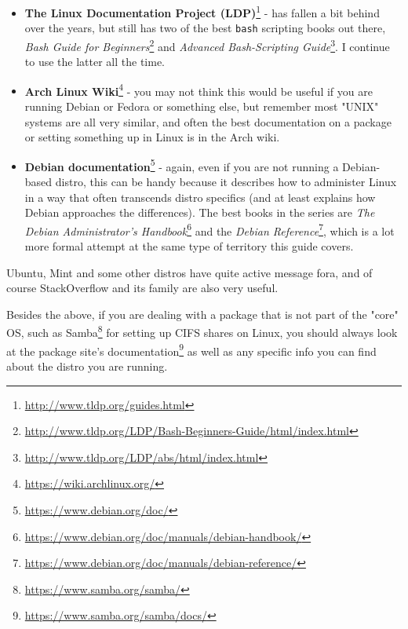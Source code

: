 \documentclass[10pt,]{book}
\renewcommand{\href}[2]{#2\footnote{\url{#1}}}
\numberwithin{figure}{chapter}
\begin{document}
\begin{itemize}
\item
  \href{http://www.tldp.org/guides.html}{\textbf{The Linux Documentation
  Project (LDP)}} - has fallen a bit
  behind over the years, but still has two of the best \texttt{bash}
  scripting books out there,
  \href{http://www.tldp.org/LDP/Bash-Beginners-Guide/html/index.html}{\emph{Bash
  Guide for Beginners}} and
  \href{http://www.tldp.org/LDP/abs/html/index.html}{\emph{Advanced
  Bash-Scripting Guide}}. I continue to use the latter all the time.
\item
  \href{https://wiki.archlinux.org/}{\textbf{Arch Linux
  Wiki}} - you may not think this would be useful if
  you are running Debian or Fedora or something else, but remember most
  "UNIX" systems are all very similar, and often the best documentation
  on a package or setting something up in Linux is in the Arch wiki.
\item
  \href{https://www.debian.org/doc/}{\textbf{Debian documentation}} -
  again, even if you are not running a Debian-based distro, this can be
  handy because it describes how to administer Linux in a way that often
  transcends distro specifics (and at least explains how Debian
  approaches the differences). The best books in the series are
  \href{https://www.debian.org/doc/manuals/debian-handbook/}{\emph{The
  Debian Administrator's
  Handbook}} and the
  \href{https://www.debian.org/doc/manuals/debian-reference/}{\emph{Debian
  Reference}}, which is a lot more formal
  attempt at the same type of territory this guide covers.
\end{itemize}

Ubuntu, Mint and some other distros have quite active message fora, and
of course StackOverflow and its family are also very useful.

Besides the above, if you are dealing with a package that is not part of
the "core" OS, such as \href{https://www.samba.org/samba/}{Samba} for
setting up CIFS shares on Linux, you should always look at
\href{https://www.samba.org/samba/docs/}{the package site's
documentation} as well as any specific info you can find about the
distro you are running.

\end{document}
